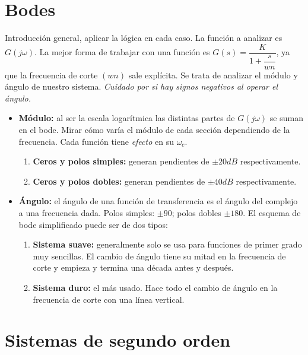 \documentclass[a4paper, twocolumn, 10pt]{article}
\newlength{\du}
\begin{document}
\section{Bodes}
\vspace*{-1em}
Introducción general, aplicar la lógica en cada caso. La función a analizar es $G(j\omega)$. La mejor forma de trabajar con una función es $G(s) = \dfrac{K}{1 + \dfrac{s}{wn}}$, ya que la frecuencia de corte $(wn)$ sale explícita. Se trata de analizar el módulo y ángulo de nuestro sistema. \textit{Cuidado por si hay signos negativos al operar el ángulo.}

\begin{itemize}
	\item \textbf{Módulo:} al ser la escala logarítmica las distintas partes de $G(j\omega)$ se suman en el bode. Mirar cómo varía el módulo de cada sección dependiendo de la frecuencia. Cada función tiene \textit{efecto} en su $\omega_c$.
	\begin{enumerate}
		\item \textbf{Ceros y polos simples:} generan pendientes de $\pm20dB$ respectivamente.
		\item \textbf{Ceros y polos dobles:} generan pendientes de $\pm40dB$ respectivamente.
	\end{enumerate}
	\item \textbf{Ángulo:} el ángulo de una función de transferencia es el ángulo del complejo a una frecuencia dada. Polos simples: $\pm90$\textdegree; polos dobles $\pm180$\textdegree. El esquema de bode simplificado puede ser de dos tipos:
	\begin{enumerate}
		\item \textbf{Sistema suave:} generalmente solo se usa para funciones de primer grado muy sencillas. El cambio de ángulo tiene su mitad en la frecuencia de corte y empieza y termina una década antes y después.
		\item \textbf{Sistema duro:} el más usado. Hace todo el cambio de ángulo en la frecuencia de corte con una línea vertical.
	\end{enumerate}
\end{itemize}

\section{Sistemas de segundo orden}
\end{document}
